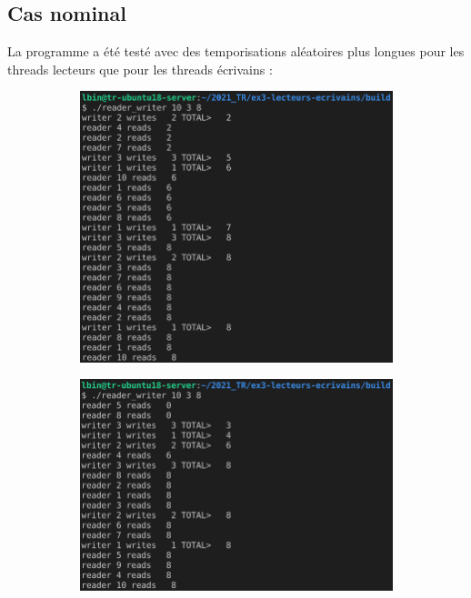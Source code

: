 \documentclass{article}
\begin{document}
    \subsection{Cas nominal}
    La programme a été testé avec des temporisations aléatoires plus longues pour les threads lecteurs que pour les threads écrivains :
    \begin{figure}[H]
        \centering
        \begin{subfigure}[b]{.49\textwidth}
            \centering
            \includegraphics[width=\textwidth]{./screenshots/test1.png}
        \end{subfigure}
        \begin{subfigure}[b]{.49\textwidth}
            \centering
            \includegraphics[width=\textwidth]{./screenshots/test2.png}
        \end{subfigure}
    \end{figure}
\end{document}
